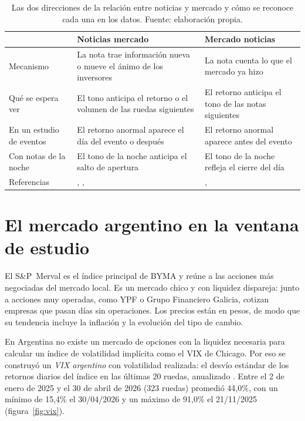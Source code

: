 \begin{table}[H]
\centering\small
\begin{tabularx}{\linewidth}{@{}L{2.8cm}YY@{}}
\toprule
 & \textbf{Noticias \flecha{} mercado} & \textbf{Mercado \flecha{} noticias} \\
\midrule
Mecanismo & La nota trae información nueva o mueve el ánimo de los inversores & La nota cuenta lo que el mercado ya hizo \\
Qué se espera ver & El tono anticipa el retorno o el volumen de las ruedas siguientes & El retorno anticipa el tono de las notas siguientes \\
En un estudio de eventos & El retorno anormal aparece el día del evento o después & El retorno anormal aparece antes del evento \\
Con notas de la noche & El tono de la noche anticipa el salto de apertura & El tono de la noche refleja el cierre del día \\
Referencias & \citet{tetlock2007}, \citet{garcia2013}, \citet{galdi2018} & \citet{tetlock2007}, \citet{verma2026} \\
\bottomrule
\end{tabularx}
\caption{Las dos direcciones de la relación entre noticias y mercado y cómo se reconoce cada
una en los datos. Fuente: elaboración propia.}
\label{tab:mecanismos}
\end{table}

\section{El mercado argentino en la ventana de estudio}
\label{sec:mercado-argentino}

El S\&P~Merval es el índice principal de BYMA y reúne a las acciones más negociadas del
mercado local. Es un mercado chico y con liquidez dispareja: junto a acciones muy operadas,
como YPF o Grupo Financiero Galicia, cotizan empresas que pasan días sin operaciones. Los
precios están en pesos, de modo que su tendencia incluye la inflación y la evolución del tipo
de cambio.

En Argentina no existe un mercado de opciones con la liquidez necesaria para calcular un
índice de volatilidad implícita como el VIX de Chicago. Por eso se construyó un \textit{VIX
argentino} con volatilidad realizada: el desvío estándar de los retornos diarios del índice en
las últimas 20 ruedas, anualizado \citep{sakowski2023}. Entre el 2 de enero de 2025 y el 30
de abril de 2026 (323 ruedas) promedió 44,0\%, con un mínimo de 15,4\% el 30/04/2026 y un
máximo de 91,0\% el 21/11/2025 (figura~\ref{fig:vix}).

